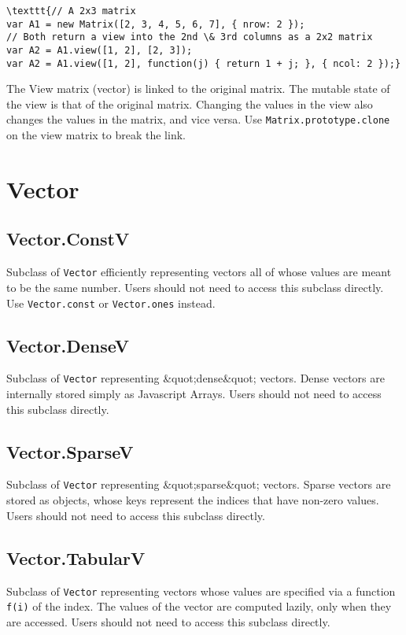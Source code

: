 \documentclass{article}
\begin{document}
\begin{lstlisting}
\texttt{// A 2x3 matrix
var A1 = new Matrix([2, 3, 4, 5, 6, 7], { nrow: 2 });
// Both return a view into the 2nd \& 3rd columns as a 2x2 matrix
var A2 = A1.view([1, 2], [2, 3]);
var A2 = A1.view([1, 2], function(j) { return 1 + j; }, { ncol: 2 });}\end{lstlisting}
The View matrix (vector) is linked to the original matrix.
The mutable state of the view is that of the original
matrix. Changing the values in the view also changes the values in the matrix,
and vice versa. Use \texttt{Matrix.prototype.clone} on the view matrix to break the link.


  \section{Vector}
    \subsection*{Vector.ConstV}
    Subclass of \texttt{Vector} efficiently representing vectors all of whose
values are meant to be the same number.
Users should not need to access this subclass directly.
Use \texttt{Vector.const} or \texttt{Vector.ones} instead.


    \subsection*{Vector.DenseV}
    Subclass of \texttt{Vector} representing \&quot;dense\&quot; vectors.
Dense vectors are internally stored simply as Javascript Arrays.
Users should not need to access this subclass directly.


    \subsection*{Vector.SparseV}
    Subclass of \texttt{Vector} representing \&quot;sparse\&quot; vectors.
Sparse vectors are stored as objects, whose keys represent the indices
that have non-zero values.
Users should not need to access this subclass directly.


    \subsection*{Vector.TabularV}
    Subclass of \texttt{Vector} representing vectors whose values are specified via
a function \texttt{f(i)} of the index.
The values of the vector are computed lazily, only when they are accessed.
Users should not need to access this subclass directly.
\end{document}
